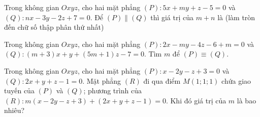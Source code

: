 \begin{ex} %
Trong không gian $Oxyz$, cho hai mặt phẳng $\left(P\right) \colon 5x+my+z-5=0$ và $\left(Q\right) \colon nx-3y-2z+7=0$. Để $\left(P\right) \parallel \left(Q\right)$ thì giá trị của $m+n$ là (làm tròn đến chữ số thập phân thứ nhất)
\end{ex}

\begin{ex} %
Trong không gian $Oxyz$, cho hai mặt phẳng $\left(P\right) \colon 2x-my-4z-6+m=0$ và $\left(Q\right) \colon \left(m+3\right)x +y+\left(5m+1\right)z -7=0$. Tìm $m$ để $\left(P\right) \equiv \left(Q\right)$.
\end{ex}

\begin{ex} %
Trong không gian $Oxyz$, cho hai mặt phẳng $\left(P\right) \colon x-2y-z+3=0$ và $\left(Q\right) \colon 2x +y+z -1=0$. Mặt phẳng $\left(R\right)$ đi qua điểm $M\left(1;1;1\right)$ chứa giao tuyến của $\left(P\right)$ và $\left(Q\right)$; phương trình của $\left(R\right) \colon m\left(x-2y-z+3\right) + \left(2x+y+z-1\right)=0$. Khi đó giá trị của $m$ là bao nhiêu?
\end{ex}

